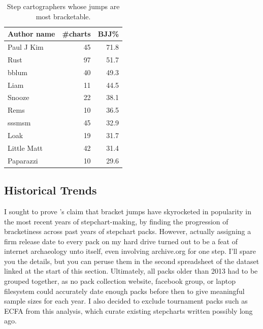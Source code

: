 \documentclass[10pt]{sigplanconf}
\begin{document}
\begin{table}[t]
	\begin{center}
		\small
	\begin{tabular}{l|r|r}
		\bf Author name & \bf \#charts & \bf BJJ\% \\
		\hline
		Paul J Kim & 45 & 71.8 \\
		Rust & 97 & 51.7 \\
		bblum & 40 & 49.3 \\
		Liam & 11 & 44.5 \\
		Snooze & 22 & 38.1 \\
		Rems & 10 & 36.5 \\
		sssmsm & 45 & 32.9 \\
		Loak & 19 & 31.7 \\
		Little Matt & 42 & 31.4 \\
		Paparazzi & 10 & 29.6 \\
	\end{tabular}
	\end{center}
	\caption{Step cartographers whose jumps are most bracketable.}
	\label{tab:author-bjj}
\end{table}

\subsection{Historical Trends}
\label{sec:eval-years}

I sought to prove \cite{dril}'s claim that bracket jumps have skyrocketed in popularity in the most recent years of stepchart-making,
by finding the progression of bracketiness across past years of stepchart packs.
However,
actually assigning a firm release date to every pack on my hard drive turned out to be a feat of internet archaeology unto itself,
even involving archive.org for one step.
I'll spare you the details, but you can peruse them in the second spreadsheet of the dataset linked at the start of this section.
Ultimately, all packs older than 2013 had to be grouped together,
as no pack collection website, facebook group, or laptop filesystem could accurately date enough packs
before then to give meaningful sample sizes for each year.
I also decided to exclude tournament packs such as ECFA from this analysis,
which curate existing stepcharts written possibly long ago.
\end{document}
